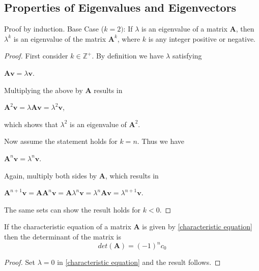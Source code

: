 \documentclass[conference,12pt,onecolumn,compsoc]{IEEEtran}
\begin{document}
\subsection{Properties of Eigenvalues and Eigenvectors}
\label{section: Properties of Eigenvalues and Eigenvectors}

\begin{proposition}
Proof by induction. Base Case ($k=2)$: If $\lambda$ is an eigenvalue of a matrix \textbf{A}, then $\lambda^k$ is an eigenvalue of the matrix $\textbf{A}^k$, where $k$ is any integer positive or negative.
\end{proposition}
\begin{proof}
First consider $k\in\mathbb{Z}^+$. By definition we have $\lambda$ satisfying 
\begin{center}
$\textbf{Av} = \lambda\textbf{v}$.
\end{center} 
Multiplying the above by \textbf{A} results in
\begin{center}
$\textbf{A}^2\textbf{v}=\lambda\textbf{Av}=\lambda^2\textbf{v}$,
\end{center}
which shows that $\lambda^2$ is an eigenvalue of $\textbf{A}^2$.

Now assume the statement holds for $k = n$. Thus we have
\begin{center}
$\textbf{A}^n\textbf{v}=\lambda^n\textbf{v}$.
\end{center}
Again, multiply both sides by \textbf{A}, which results in
\begin{center}
$\textbf{A}^{n+1}\textbf{v}=\textbf{A}\textbf{A}^{n}\textbf{v}=
\textbf{A}\lambda^n\textbf{v}=\lambda^n\textbf{A}\textbf{v}=\lambda^{n+1}\textbf{v}$.
\end{center}

The same sets can show the result holds for $k<0$.
\end{proof}

\begin{proposition}
If the characteristic equation of a matrix \textbf{A} is given by \eqref{characteristic equation} then the determinant of the matrix is
\begin{equation}
det(\textbf{A}) = (-1)^nc_0
\label{determinant equation}
\end{equation}
\end{proposition}
\begin{proof}
Set $\lambda=0$ in \eqref{characteristic equation} and the result follows.
\end{proof}
\end{document}
